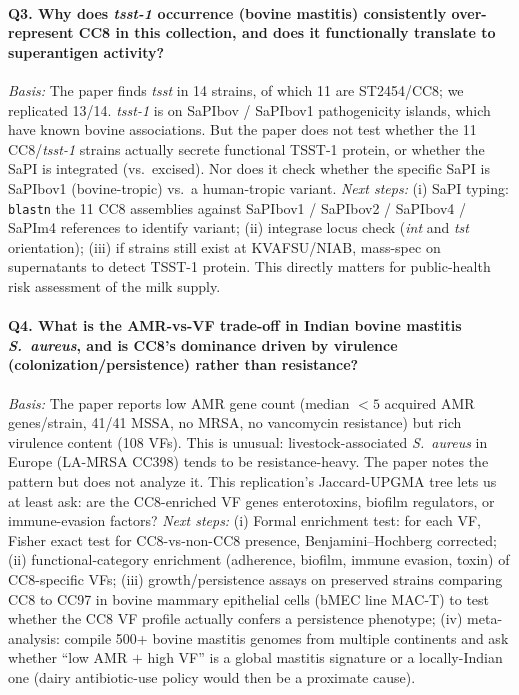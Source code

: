 \documentclass[11pt]{article}
\begin{document}
\paragraph{Q3. Why does \emph{tsst-1} occurrence (bovine mastitis)
consistently over-represent CC8 in this collection, and does it functionally
translate to superantigen activity?}
\emph{Basis:} The paper finds \emph{tsst} in 14 strains, of which 11 are
ST2454/CC8; we replicated 13/14. \emph{tsst-1} is on SaPIbov / SaPIbov1
pathogenicity islands, which have known bovine associations. But the paper
does not test whether the 11 CC8/\emph{tsst-1} strains actually secrete
functional TSST-1 protein, or whether the SaPI is integrated (vs.\ excised).
Nor does it check whether the specific SaPI is SaPIbov1 (bovine-tropic) vs.\
a human-tropic variant. \emph{Next steps:} (i) SaPI typing:
\texttt{blastn} the 11 CC8 assemblies against SaPIbov1 / SaPIbov2 /
SaPIbov4 / SaPIm4 references to identify variant; (ii) integrase locus
check (\emph{int} and \emph{tst} orientation); (iii) if strains still
exist at KVAFSU/NIAB, mass-spec on supernatants to detect TSST-1 protein.
This directly matters for public-health risk assessment of the milk supply.

\paragraph{Q4. What is the AMR-vs-VF trade-off in Indian bovine mastitis
\emph{S.\ aureus}, and is CC8's dominance driven by virulence
(colonization/persistence) rather than resistance?}
\emph{Basis:} The paper reports low AMR gene count (median $<5$ acquired
AMR genes/strain, 41/41 MSSA, no MRSA, no vancomycin resistance) but rich
virulence content (108 VFs). This is unusual: livestock-associated
\emph{S.\ aureus} in Europe (LA-MRSA CC398) tends to be resistance-heavy.
The paper notes the pattern but does not analyze it. This replication's
Jaccard-UPGMA tree lets us at least ask: are the CC8-enriched VF genes
enterotoxins, biofilm regulators, or immune-evasion factors?
\emph{Next steps:} (i) Formal enrichment test: for each VF, Fisher exact
test for CC8-vs-non-CC8 presence, Benjamini--Hochberg corrected; (ii)
functional-category enrichment (adherence, biofilm, immune evasion, toxin)
of CC8-specific VFs; (iii) growth/persistence assays on preserved strains
comparing CC8 to CC97 in bovine mammary epithelial cells (bMEC line MAC-T)
to test whether the CC8 VF profile actually confers a persistence
phenotype; (iv) meta-analysis: compile 500+ bovine mastitis genomes from
multiple continents and ask whether ``low AMR $+$ high VF'' is a global
mastitis signature or a locally-Indian one (dairy antibiotic-use policy
would then be a proximate cause).
\end{document}
